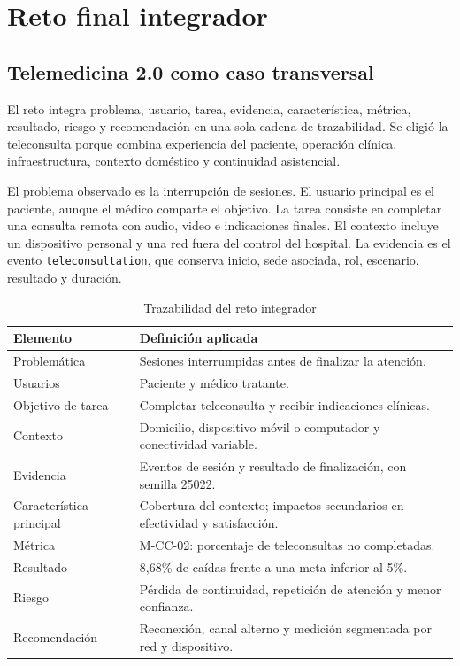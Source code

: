 \section{Reto final integrador}

\subsection{Telemedicina 2.0 como caso transversal}

El reto integra problema, usuario, tarea, evidencia, característica, métrica, resultado, riesgo y recomendación en una sola cadena de trazabilidad. Se eligió la teleconsulta porque combina experiencia del paciente, operación clínica, infraestructura, contexto doméstico y continuidad asistencial.

El problema observado es la interrupción de sesiones. El usuario principal es el paciente, aunque el médico comparte el objetivo. La tarea consiste en completar una consulta remota con audio, video e indicaciones finales. El contexto incluye un dispositivo personal y una red fuera del control del hospital. La evidencia es el evento \texttt{teleconsultation}, que conserva inicio, sede asociada, rol, escenario, resultado y duración.

\begin{table}[H]
\centering
\caption{Trazabilidad del reto integrador}
\begin{tabularx}{\textwidth}{p{3.1cm}Y}
\toprule
Elemento & Definición aplicada \\
\midrule
Problemática & Sesiones interrumpidas antes de finalizar la atención. \\
Usuarios & Paciente y médico tratante. \\
Objetivo de tarea & Completar teleconsulta y recibir indicaciones clínicas. \\
Contexto & Domicilio, dispositivo móvil o computador y conectividad variable. \\
Evidencia & Eventos de sesión y resultado de finalización, con semilla 25022. \\
Característica principal & Cobertura del contexto; impactos secundarios en efectividad y satisfacción. \\
Métrica & M-CC-02: porcentaje de teleconsultas no completadas. \\
Resultado & 8,68\% de caídas frente a una meta inferior al 5\%. \\
Riesgo & Pérdida de continuidad, repetición de atención y menor confianza. \\
Recomendación & Reconexión, canal alterno y medición segmentada por red y dispositivo. \\
\bottomrule
\end{tabularx}
\end{table}

